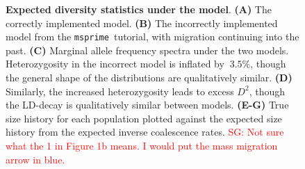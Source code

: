 \documentclass{article}
\newcommand{\msprime}[0]{\texttt{msprime}}
\newcommand{\sgcomment}[1]{{\textcolor{red}{SG: #1}}}
\begin{document}



\pagebreak

\begin{figure}[ht]
\begin{center}
\caption{\textbf{Expected diversity statistics under the \citet{gutenkunst2009inferring} model}.
    \textbf{(A)} The correctly implemented model.
    \textbf{(B)} The incorrectly implemented model from the \msprime\ tutorial, with migration continuing
    into the past.
    \textbf{(C)} Marginal allele frequency spectra under the two models. Heterozygosity in the incorrect model
    is inflated by $~3.5\%$, though the general shape of the distributions are qualitatively similar.
    \textbf{(D)} Similarly, the increased heterozygosity leads to excess $D^2$, though the LD-decay is
    qualitatively similar between models.
    \textbf{(E-G)} True size history for each population plotted against the expected size history from
    the expected inverse coalescence rates.
    \sgcomment{Not sure what the 1 in Figure 1b means. I would put the mass migration arrow in blue. }
}
\label{fig:ooa_stats}
\end{center}
\end{figure}
\end{document}
